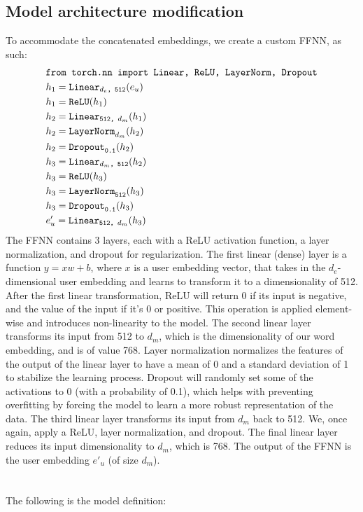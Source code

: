 \documentclass{article}
\begin{document}
\subsection{Model architecture modification}
To accommodate the concatenated embeddings, we create a custom FFNN, as such:
\begin{equation}
	\begin{aligned}
	&\text{\texttt{from torch.nn import Linear, ReLU, LayerNorm, Dropout}} \\
	&h_{1} = \text{\texttt{Linear}}_{\text{\texttt{$d_e$, 512}}}(e_u) \\
	&h_{1} = \text{\texttt{ReLU}}(h_{1}) \\
	&h_{2} = \text{\texttt{Linear}}_{\text{\texttt{512, $d_m$}}}(h_{1}) \\
	&h_{2} = \text{\texttt{LayerNorm}}_{\text{\texttt{$d_m$}}}(h_{2}) \\
	&h_{2} = \text{\texttt{Dropout}}_{\text{\texttt{0.1}}}(h_{2}) \\
	&h_{3} = \text{\texttt{Linear}}_{\text{\texttt{$d_m$, 512}}}(h_{2}) \\
	&h_{3} = \text{\texttt{ReLU}}(h_{3}) \\
	&h_{3} = \text{\texttt{LayerNorm}}_{\text{\texttt{512}}}(h_{3}) \\
	&h_{3} = \text{\texttt{Dropout}}_{\text{\texttt{0.1}}}(h_{3}) \\
	&e'_u = \text{\texttt{Linear}}_{\text{\texttt{512, $d_m$}}}(h_{3}) \\
	\end{aligned}
\end{equation}
The FFNN contains 3 layers, each with a ReLU activation function, a layer normalization, and dropout for regularization.
The first linear (dense) layer is a function $y = xw + b$, where $x$ is a user embedding vector, that takes in the $d_e$-dimensional user embedding and learns to transform it to a dimensionality of 512.
After the first linear transformation, ReLU will return 0 if its input is negative, and the value of the input if it's 0 or positive. This operation is applied element-wise and introduces non-linearity to the model.
The second linear layer transforms its input from 512 to $d_m$, which is the dimensionality of our word embedding, and is of value 768.
Layer normalization normalizes the features of the output of the linear layer to have a mean of 0 and a standard deviation of 1 to stabilize the learning process.
Dropout will randomly set some of the activations to 0 (with a probability of 0.1), which helps with preventing overfitting by forcing the model to learn a more robust representation of the data.
The third linear layer transforms its input from $d_m$ back to 512. We, once again, apply a ReLU, layer normalization, and dropout.
The final linear layer reduces its input dimensionality to $d_m$, which is 768. The output of the FFNN is the user embedding $e'_u$ (of size $d_m$).\\
\\
\\
The following is the model definition:\\
	
\end{document}

